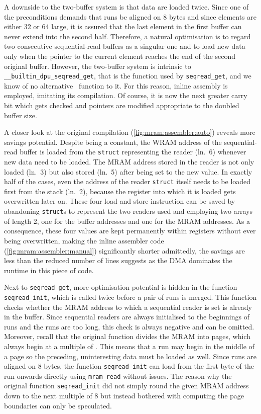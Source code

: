 A downside to the two-buffer system is that data are loaded twice.
Since one of the preconditions demands that runs be aligned on 8 bytes and since elements are either \qty{32}{\bit} or \qty{64}{\bit} large, it is assured that the last element in the first buffer can never extend into the second half.
Therefore, a natural optimisation is to regard two consecutive sequential-read buffers as a singular one and to load new data only when the pointer to the current element reaches the end of the second original buffer.
However, the two-buffer system is intrinsic to \lstinline|__builtin_dpu_seqread_get|, that is the function used by \lstinline|seqread_get|, and we know of no alternative \langC{}~function to it.
For this reason, inline assembly is employed, imitating its compilation.
Of course, it is now the next greater carry bit which gets checked and pointers are modified appropriate to the doubled buffer size.

A closer look at the original compilation (\cref{fig:mram:assembler:auto}) reveals more savings potential.
Despite being a constant, the WRAM address of the sequential-read buffer is loaded from the \lstinline[keywords={}]|struct| representing the reader (ln.~6) whenever new data need to be loaded.
The MRAM address stored in the reader is not only loaded (ln.~3) but also stored (ln.~5) after being set to the new value.
In exactly half of the cases, even the address of the reader \lstinline[keywords={}]|struct| itself needs to be loaded first from the stack (ln.~2), because the register into which it is loaded gets overwritten later on.
These four load and store instruction can be saved by abandoning \lstinline[keywords={}]|struct|s to represent the two readers used and employing two arrays of length 2, one for the buffer addresses and one for the MRAM addresses.
As a consequence, these four values are kept permanently within registers without ever being overwritten, making the inline assembler code (\cref{fig:mram:assembler:manual}) significantly shorter \Dash admittedly, the savings are less than the reduced number of lines suggests as the DMA dominates the runtime in this piece of code.

Next to \lstinline|seqread_get|, more optimisation potential is hidden in the function \lstinline|seqread_init|, which is called twice before a pair of runs is merged.
This function checks whether the MRAM address to which a sequential reader is set is already in the buffer.
Since sequential readers are always initialised to the beginnings of runs and the runs are too long, this check is always negative and can be omitted.
Moreover, recall that the original function divides the MRAM into pages, which always begin at a multiple of \seqreadcachesize{}.
This means that a run may begin in the middle of a page so the preceding, uninteresting data must be loaded as well.
Since runs are aligned on 8 bytes, the function \lstinline|seqread_init| can load from the first byte of the run onwards directly using \lstinline|mram_read| without issues.
The reason why the original function \lstinline|seqread_init| did not simply round the given MRAM address down to the next multiple of 8 but instead bothered with computing the page boundaries can only be speculated.


